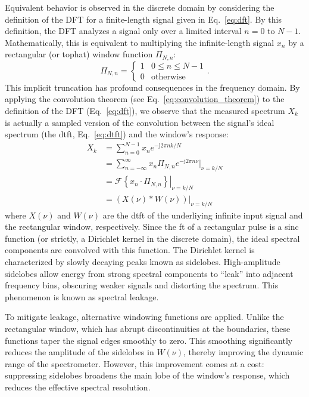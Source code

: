 Equivalent behavior is observed in the discrete domain by considering the definition of the DFT for a finite-length signal given in Eq.\ \ref{eq:dft}. By this definition, the DFT analyzes a signal only over a limited interval $n=0$ to $N-1$. Mathematically, this is equivalent to multiplying the infinite-length signal $x_n$ by a rectangular (or tophat) window function $\Pi_{N,n}$:
\begin{equation}
    \Pi_{N,n} =
    \begin{cases}
        1 & 0 \leq n \leq N-1 \\
        0 & \text{otherwise}
    \end{cases}.
\end{equation}
This implicit truncation has profound consequences in the frequency domain. By applying the convolution theorem (see Eq.\ \ref{eq:convolution_theorem}) to the definition of the DFT (Eq.\ \ref{eq:dft}), we observe that the measured spectrum $X_k$ is actually a sampled version of the convolution between the signal's ideal spectrum (the \gls{dtft}, Eq.\ \ref{eq:dtft}) and the window's response:
\begin{align}
    X_k &= \sum_{n=0}^{N-1} x_n e^{-\mathrm{j} 2\pi n k / N} \\
        &= \sum_{n=-\infty}^{\infty} x_n \Pi_{N,n} e^{-\mathrm{j} 2\pi n \nu} \bigg|_{\nu = k/N} \\
        &= \left. \mathcal{F} \left\{ x_n \cdot \Pi_{N,n} \right\} \right|_{\nu = k/N} \\
        &= \left. \left( X(\nu) * W(\nu) \right) \right|_{\nu = k/N}  
\end{align}
where $X(\nu)$ and $W(\nu)$ are the \gls{dtft} of the underliying infinite input signal and the rectangular window, respectively. Since the \gls{ft} of a rectangular pulse is a sinc function (or strictly, a Dirichlet kernel in the discrete domain), the ideal spectral components are convolved with this function. The Dirichlet kernel is characterized by slowly decaying peaks known as sidelobes. High-amplitude sidelobes allow energy from strong spectral components to ``leak'' into adjacent frequency bins, obscuring weaker signals and distorting the spectrum. This phenomenon is known as spectral leakage.

To mitigate leakage, alternative windowing functions are applied. Unlike the rectangular window, which has abrupt discontinuities at the boundaries, these functions taper the signal edges smoothly to zero. This smoothing significantly reduces the amplitude of the sidelobes in $W(\nu)$, thereby improving the dynamic range of the spectrometer. However, this improvement comes at a cost: suppressing sidelobes broadens the main lobe of the window's response, which reduces the effective spectral resolution.

